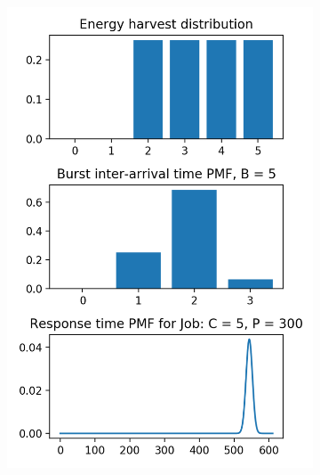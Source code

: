 \documentclass[a4paper,oneside]{csthesis}
\begin{document}
\begin{figure}[ht]
    
    \centering
    \begin{subfigure}[b]{0.45\textwidth}
        \caption{}
        \label{subfig:energy1}
        \includegraphics[width=\textwidth]{figures/energy1.png}
    \end{subfigure}
    ~
    \begin{subfigure}[b]{0.45\textwidth}
        \caption{}
        \label{subfig:energy2}

\end{subfigure}
\end{figure}
\end{document}
